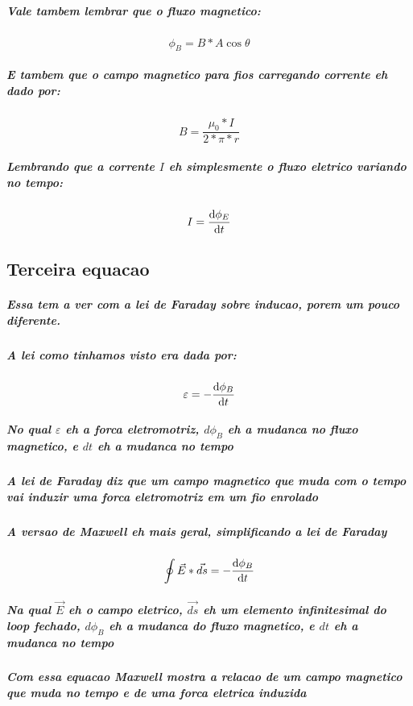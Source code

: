 \documentclass[12pt,twoside, a4paper, twocolumn]{article}
\begin{document}
\subparagraph*{Vale tambem lembrar que o fluxo magnetico:}
\begin{equation}
    \phi_B = B  *  A \cos{\theta}
\end{equation}
\subparagraph*{E tambem que o campo magnetico para fios carregando corrente eh dado por:}
\begin{equation}
    B = \frac{\mu_0 * I}{2 * \pi * r}
\end{equation}
\subparagraph*{Lembrando que a corrente $I$ eh simplesmente o fluxo eletrico variando no tempo:}
\begin{equation}
    I = \frac{\mathrm d \phi_E}{\mathrm d t}
\end{equation}


\subsection{Terceira equacao}
\subparagraph*{Essa tem a ver com a lei de Faraday sobre inducao, porem um pouco diferente.}
\subparagraph*{A lei como tinhamos visto era dada por:}
\begin{equation}
    \varepsilon = - \frac{\mathrm d \phi_B}{\mathrm d t}
\end{equation}
\subparagraph*{No qual $\varepsilon$ eh a forca eletromotriz, $d\phi_B$ eh a mudanca no fluxo magnetico, e $dt$ eh a mudanca no tempo}
\subparagraph*{A lei de Faraday diz que um campo magnetico que muda com o tempo vai induzir uma forca eletromotriz em um fio enrolado}
\subparagraph*{A versao de Maxwell eh mais geral, simplificando a lei de Faraday}
\begin{equation}
    \oint \vec{E} * \vec{ds} = - \frac{\mathrm d \phi_B}{\mathrm d t}
\end{equation}
\subparagraph*{Na qual $\vec{E}$ eh o campo eletrico, $\vec{ds}$ eh um elemento infinitesimal do loop fechado, $d\phi_B$ eh a mudanca do fluxo magnetico, e $dt$ eh a mudanca no tempo}
\subparagraph*{Com essa equacao Maxwell mostra a relacao de um campo magnetico que muda no tempo e de uma forca eletrica induzida}
\end{document}
